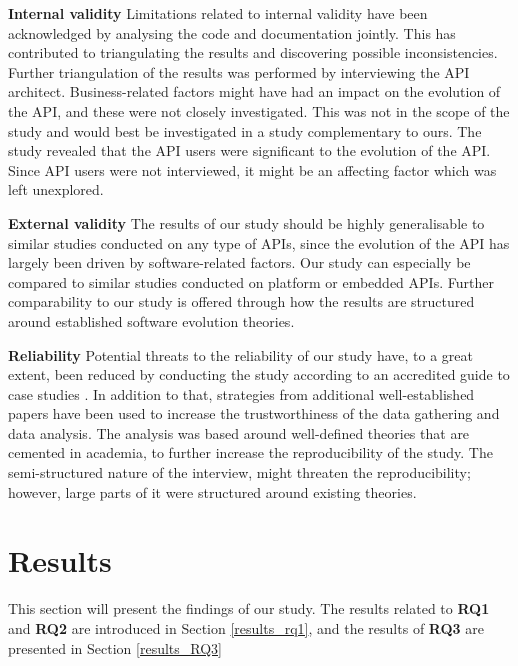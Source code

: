 \documentclass{sig-alternate}
\begin{document}
\smallskip \noindent
\textbf{Internal validity  } Limitations related to internal validity have been acknowledged by analysing the code and documentation jointly. This has contributed to triangulating the results and discovering possible inconsistencies. Further triangulation of the results was performed by interviewing the API architect. Business-related factors might have had an impact on the evolution of the API, and these were not closely investigated. This was not in the scope of the study and would best be investigated in a study complementary to ours. The study revealed that the API users were significant to the evolution of the API. Since API users were not interviewed, it might be an affecting factor which was left unexplored. 

\smallskip \noindent
\textbf{External validity  } The results of our study should be highly generalisable to similar studies conducted on any type of APIs, since the evolution of the API has largely been driven by software-related factors. Our study can especially be compared to similar studies conducted on platform or embedded APIs. Further comparability to our study is offered through how the results are structured around established software evolution theories. 

\smallskip \noindent
\textbf{Reliability  } Potential threats to the reliability of our study have, to a great extent, been reduced by conducting the study according to an accredited guide to case studies \cite{runeson2009guidelines}. In addition to that, strategies from additional well-established papers \cite{andersson2007spiral} \cite{seaman1999qualitative} \cite{robson2002real} have been used to increase the trustworthiness of the data gathering and data analysis. The analysis was based around well-defined theories that are cemented in academia, to further increase the reproducibility of the study. The semi-structured nature of the interview, might threaten the reproducibility; however, large parts of it were structured around existing theories. 




\section{Results} \label{results} 
This section will present the findings of our study. The results related to \textbf{RQ1} and \textbf{RQ2} are introduced in Section \ref{results_rq1}, and the results of \textbf{RQ3} are presented in Section \ref{results_RQ3}
\end{document}
